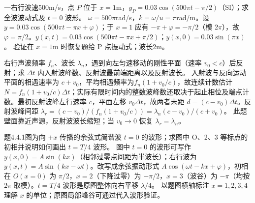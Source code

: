 \problemtext 一右行波速500m/s，点 $P$ 位于 $x=1$m，$y_P=0.03\cos(500\pi t-\pi/2)$（SI）；求全波波动式及 $t=0$ 波形。
\workings $\omega=500\pi$rad/s，$k=\omega/u=\pi$rad/m。设 $y=0.03\cos(500\pi t-\pi x+\varphi)$；于 $x=1$ 应有 $-\pi+\varphi=-\pi/2$（模 $2\pi$），故 $\varphi=\pi/2$。$\boxed{y(x,t)=0.03\cos(500\pi t-\pi x+\pi/2)}$；$\boxed{y(x,0)=0.03\sin(\pi x)}$。
\crosscheck 验证在 $x=1$m 时恢复题给 P 点振动式；波长2m。

\problemtext 右行声波频率 $f_n$、波长 $\lambda_n$，遇到向左匀速移动的刚性平面（速率 $v_0<c$）后反射；求 $\Delta t$ 内入射波峰数、反射波最前端距离以及反射波长。
\workings 入射波与反向运动平面的相遇速率为 $c+v_0$，平均相遇频率为$f_n(1+v_0/c)$，故连续计数估计 $\boxed{N=f_n(1+v_0/c)\Delta t}$；实际有限时间内的整数波峰数还取决于起止相位及端点计数。最初反射波峰左行速率 $c$，平面左移 $v_0\Delta t$，故两者末距 $\boxed{d=(c-v_0)\Delta t}$。反射波峰间距 $\lambda_r=(c-v_0)/(f_n(1+v_0/c))=\boxed{\lambda_n(c-v_0)/(c+v_0)}$。
\crosscheck 此题壁面靠近声源，反射波波长缩短；当 $v_0\to0$ 恢复 $\lambda_r=\lambda_n$。

\problemtext 题4.4.1图为向 $+x$ 传播的余弦式简谐波 $t=0$ 的波形；求图中 O、2、3 等标点的初相并说明如何画出 $t=T/4$ 波形。
\workings 图中 $t=0$ 的波形可写作 $y(x,0)=A\sin(kx)$（相邻过零点间距为半波长）；右行波为 $\boxed{y(x,t)=A\sin(kx-\omega t)}$。改写成余弦振动形式 $A\cos(\omega t-kx+\varphi)$，初相在 $O(x=0)$ 为 $\pi/2$，$x=2$（下降过零）为 $-\pi/2$，$x=3$（波谷）为 $-\pi$（均按 $2\pi$ 取模）。$t=T/4$ 波形是原图整体向右平移 $\boxed{\lambda/4}$。
\crosscheck 以题图横轴标注 $x=1,2,3,4$ 理解 $x$ 的单位；原图局部峰谷可通过代入波形验证。
